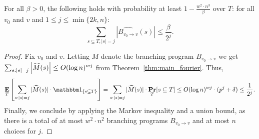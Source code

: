 \begin{claim}\label{claim:midlayers}
For all $\beta>0$, the following holds with probability at least $1-\frac{w^2 \cdot n^3}{\beta}$ over $T$:   for all  $v_0$ and $v$ and $1\le j\leq \min\{2k,n\}$:
\begin{equation}\label{eq:lowerlayers}\sum_{s \subseteq T, |s|=j}{ |\hat{B_{v_0 \to v}}(s)|} \le \frac{\beta}{2^j}.\end{equation}
\end{claim}
\begin{proof}
Fix $v_0$ and $v$. Letting $M$ denote the branching program $B_{v_0 \to v}$ we get
$
\sum_{s:|s|=j} \left| \widehat{M}(s) \right| \leq O(\log n)^{wj}
$ from Theorem~\ref{thm:main_fourier}.
Thus,
\begin{align*}
\E_T\left[ \sum_{s:|s|=j} | \widehat{M}(s)| \cdot \one_{\{s \subseteq T\}}\right] = \sum_{s:|s|=j} 
|\widehat{M}(s)| \cdot \Pr_{T}[s\subseteq T] \leq  O(\log n)^{wj} \cdot (p^j + \delta)\leq \frac{1}{2^j}.
\end{align*}
Finally, we conclude by applying the Markov inequality and a union bound, as there is a total of at most $w^2\cdot n^2$ branching programs $B_{v_0 \to v}$ and at most $n$ choices for $j$.
\end{proof}

